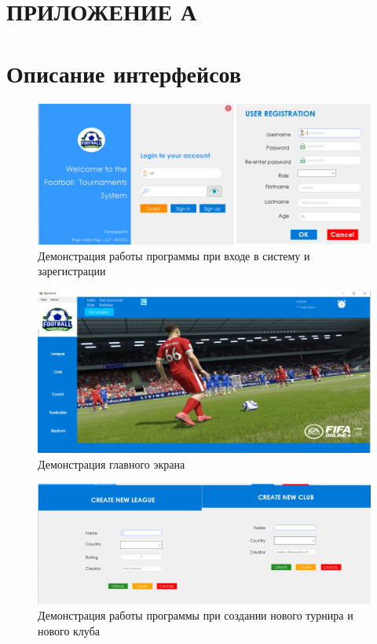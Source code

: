 \section*{\centering ПРИЛОЖЕНИЕ А}

\section*{Описание интерфейсов}

\begin{figure}[h]
	\centering
	\includegraphics[height=0.25\textheight]{img/examples/demon1.png}
	\caption{Демонстрация работы программы при входе в систему и зарегистрации}
	\label{img:ex1}
\end{figure}

\begin{figure}[h]
	\centering
	\includegraphics[height=0.3\textheight]{img/examples/demon2.png}
	\caption{Демонстрация главного экрана}
	\label{img:ex2}
\end{figure}

\begin{figure}[h]
	\centering
	\includegraphics[height=0.2\textheight]{img/examples/demon4.png}
	\caption{Демонстрация работы программы при создании нового турнира и нового клуба}
	\label{img:ex3}
\end{figure}

